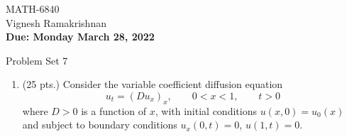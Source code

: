 \documentclass[11pt]{article}
\begin{document}
\begin{flushright}
\small{MATH-6840\\
Vignesh Ramakrishnan\\
{\bf Due: Monday March 28, 2022}}
\end{flushright}

\begin{center}
\large{Problem Set 7}\\
\end{center}

\begin{enumerate}
  \item (25 pts.) {\color{red}Consider the variable coefficient diffusion equation} 
  \[
    u_t=(Du_x)_x, \qquad 0 < x < 1, \qquad t >0
  \]
  {\color{red}where $D>0$ is a function of $x$, with initial conditions $u(x,0)=u_0(x)$ and subject to boundary conditions $u_x(0,t) = 0$, $u(1,t) = 0$.}


\end{enumerate}
\end{document}

